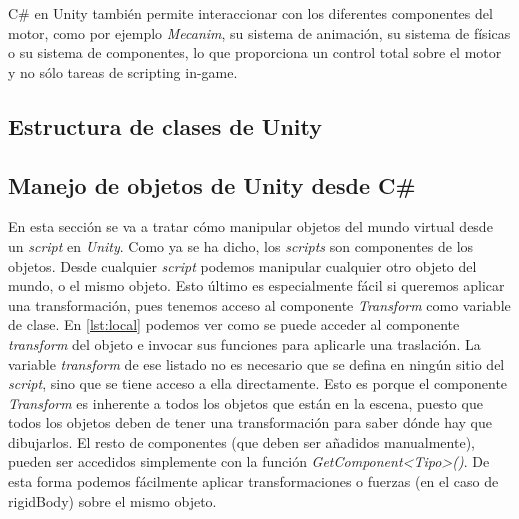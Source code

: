 \documentclass{pre-tfg}
\begin{document}
C\# en Unity también permite interaccionar con los diferentes componentes del motor, como por ejemplo \emph{Mecanim}, su sistema de animación, su sistema de físicas o su sistema de componentes, lo que proporciona un control total sobre el motor y no sólo tareas de scripting in-game.

\subsection{Estructura de clases de Unity}

\subsection{Manejo de objetos de Unity desde C\#}

En esta sección se va a tratar c\'omo manipular objetos del mundo virtual desde un \textit{script} en \textit{Unity}. Como ya se ha dicho, los \textit{scripts} son componentes de los objetos. Desde cualquier \textit{script} podemos manipular cualquier otro objeto del mundo, o el mismo objeto. Esto último es especialmente f\'acil si queremos aplicar una transformación, pues tenemos acceso al componente \textit{Transform} como variable de clase. En \ref{lst:local} podemos ver como se puede acceder al componente \textit{transform} del objeto e invocar sus funciones para aplicarle una traslación. La variable \textit{transform} de ese listado no es necesario que se defina en ningún sitio del \textit{script}, sino que se tiene acceso a ella directamente. Esto es porque el componente \textit{Transform} es inherente a todos los objetos que están en la escena, puesto que todos los objetos deben de tener una transformación para saber dónde hay que dibujarlos. El resto de componentes (que deben ser añadidos manualmente), pueden ser accedidos simplemente con la función \textit{GetComponent<Tipo>()}. De esta forma podemos fácilmente aplicar transformaciones o fuerzas (en el caso de rigidBody) sobre el mismo objeto.
\end{document}

